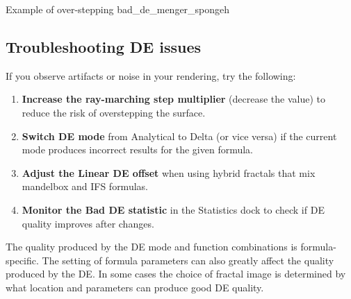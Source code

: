 {Example of over-stepping}
{bad_de_menger_sponge}{h}

\subsection{Troubleshooting DE issues}\label{de-troubleshooting}

If you observe artifacts or noise in your rendering, try the following:

\begin{enumerate}
	\item \textbf{Increase the ray-marching step multiplier} (decrease the value) to reduce the risk of overstepping the surface.
	\item \textbf{Switch DE mode} from Analytical to Delta (or vice versa) if the current mode produces incorrect results for the given formula.
	\item \textbf{Adjust the Linear DE offset} when using hybrid fractals that mix mandelbox and IFS formulas.
	\item \textbf{Monitor the Bad DE statistic} in the Statistics dock to check if DE quality improves after changes.
\end{enumerate}

The quality produced by the DE mode and function combinations is formula-specific. The setting of formula parameters can also greatly affect the quality produced by the DE. In some cases the choice of fractal image is determined by
what location and parameters can produce good DE quality.
